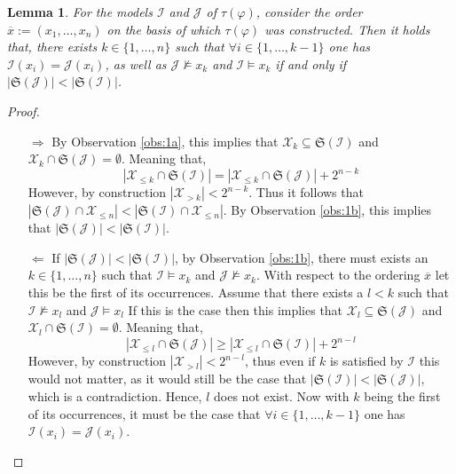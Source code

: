 \documentclass [11pt]{article}
\newcommand{\nmodels}{\not\models}
\newtheorem{lemma}[theorem]{Lemma}
\begin{document}
\begin{lemma}
\label{lem:1c}
For the models $\mathcal{I}$ and $\mathcal{J}$ of $\tau(\varphi)$, consider the order $\overline{x}:=(x_1, \dots , x_n)$ on the basis of which $\tau(\varphi)$ was constructed. Then it holds that, there exists $k \in \{1, \dots , n \}$ such that $\forall i \in  \{1, \dots , k-1 \}$ one has $\mathcal{I}(x_i)=\mathcal{J}(x_i)$, as well as $\mathcal{J} \nmodels x_k$ and $\mathcal{I}  \models x_k$ if and only if $|\mathfrak{S}(\mathcal{J})| < |\mathfrak{S}(\mathcal{I}) |$.
\end{lemma}
\begin{proof}

\begin{itemize}
\item[$\Rightarrow$]
By Observation \ref{obs:1a}, this implies that $\mathcal{X}_k \subseteq \mathfrak{S}(\mathcal{I})$ and $\mathcal{X}_k \cap \mathfrak{S}(\mathcal{J})= \emptyset$. Meaning that, 
\begin{equation*}
|\mathcal{X}_{\leq k} \cap \mathfrak{S}(\mathcal{I})| = |\mathcal{X}_{\leq k} \cap \mathfrak{S}(\mathcal{J})|+ 2^{n-k}
\end{equation*}
However, by construction $|\mathcal{X}_{> k} |<2^{n-k}$. Thus it follows that $|\mathfrak{S}(\mathcal{J}) \cap \mathcal{X}_{\leq n}| < |\mathfrak{S}(\mathcal{I}) \cap \mathcal{X}_{\leq n} |$. By Observation \ref{obs:1b}, this implies that $|\mathfrak{S}(\mathcal{J})| < |\mathfrak{S}(\mathcal{I}) |$.

\item[$\Leftarrow$] If $|\mathfrak{S}(\mathcal{J})| < |\mathfrak{S}(\mathcal{I}) |$, by Observation \ref{obs:1b}, there must exists an $k \in \{1, \dots , n\}$ such that $\mathcal{I} \models x_k$ and $\mathcal{J} \nmodels x_k$.  With respect to the ordering $\overline{x}$ let this be the first of its occurrences. Assume that there exists a $l< k$ such that $\mathcal{I} \nmodels x_l$ and $\mathcal{J} \models x_l$ If this is the case then this implies that $\mathcal{X}_{l} \subseteq \mathfrak{S}(\mathcal{J})$ and $\mathcal{X}_l \cap \mathfrak{S}(\mathcal{I})= \emptyset$. Meaning that, 
\begin{equation*}
|\mathcal{X}_{\leq l} \cap \mathfrak{S}(\mathcal{J})| \geq |\mathcal{X}_{\leq l} \cap \mathfrak{S}(\mathcal{I})|+ 2^{n-l}
\end{equation*}
However, by construction $|\mathcal{X}_{> l} |<2^{n-l}$, thus even if $k$ is satisfied by $\mathcal{I}$ this would not matter, as it would still be the case that $|\mathfrak{S}(\mathcal{I})| < |\mathfrak{S}(\mathcal{J}) |$, which is a contradiction. Hence, $l$ does not exist. Now with $k$ being the first of its occurrences, it must be the case that $\forall i \in  \{1, \dots , k-1 \}$ one has $\mathcal{I}(x_i)=\mathcal{J}(x_i)$. 
\end{itemize}
\end{proof}
\end{document}
